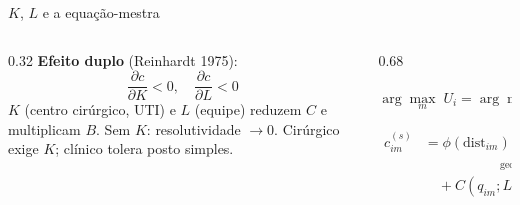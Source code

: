 \documentclass[10pt,aspectratio=169]{beamer}
\begin{document}
\begin{frame}{$K$, $L$ e a equação-mestra}
\begin{columns}[T]
\begin{column}{0.32\textwidth}
{\small
\textbf{Efeito duplo} (Reinhardt 1975):
\begin{equation*}
\frac{\partial c}{\partial K} < 0, \quad \frac{\partial c}{\partial L} < 0
\end{equation*}
$K$ (centro cirúrgico, UTI) e $L$ (equipe) reduzem $C$ e multiplicam $B$. Sem $K$: resolutividade $\to 0$. Cirúrgico exige $K$; clínico tolera posto simples.
}
\end{column}
\begin{column}{0.68\textwidth}
{\footnotesize
\begin{equation*}
\arg\max_{m}\; U_i = \arg\max_{m}\; \sum_t \delta^t \left[ \frac{\mathbb{E}(w_{mt}^{(s)})}{p_{mt}} - c_{im}^{(s)} \right]
\end{equation*}
\begin{equation*}
\begin{aligned}
c_{im}^{(s)} &=
\underbrace{\phi(\text{dist}_{im}) - \gamma A_m + \theta_i^{\text{rural}}}_{\text{geográfico}} \\
&\quad +
\underbrace{C(q_{im}; L_m, K_m, s) - \alpha_i B(q_{im}; L_m, K_m)}_{\text{laboral líquido}}
\end{aligned}
\end{equation*}
}
\end{column}
\end{columns}
\end{frame}
\end{document}
